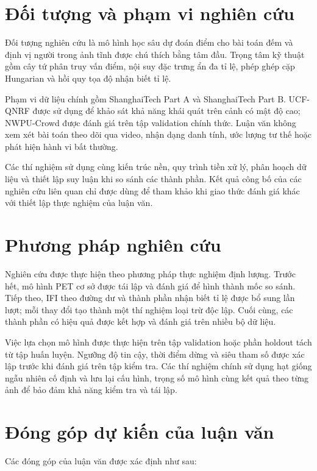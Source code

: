 \section{Đối tượng và phạm vi nghiên cứu}

Đối tượng nghiên cứu là mô hình học sâu dự đoán điểm cho bài toán đếm và định vị người trong ảnh tĩnh được chú thích bằng tâm đầu. Trọng tâm kỹ thuật gồm cây tứ phân truy vấn điểm, nội suy đặc trưng ẩn đa tỉ lệ, phép ghép cặp Hungarian và hồi quy tọa độ nhận biết tỉ lệ.

Phạm vi dữ liệu chính gồm ShanghaiTech Part A và ShanghaiTech Part B. UCF-QNRF được sử dụng để khảo sát khả năng khái quát trên cảnh có mật độ cao; NWPU-Crowd được đánh giá trên tập validation chính thức. Luận văn không xem xét bài toán theo dõi qua video, nhận dạng danh tính, ước lượng tư thế hoặc phát hiện hành vi bất thường.

Các thí nghiệm sử dụng cùng kiến trúc nền, quy trình tiền xử lý, phân hoạch dữ liệu và thiết lập suy luận khi so sánh các thành phần. Kết quả công bố của các nghiên cứu liên quan chỉ được dùng để tham khảo khi giao thức đánh giá khác với thiết lập thực nghiệm của luận văn.

\section{Phương pháp nghiên cứu}

Nghiên cứu được thực hiện theo phương pháp thực nghiệm định lượng. Trước hết, mô hình PET cơ sở được tái lập và đánh giá để hình thành mốc so sánh. Tiếp theo, IFI theo đường dư và thành phần nhận biết tỉ lệ được bổ sung lần lượt; mỗi thay đổi tạo thành một thí nghiệm loại trừ độc lập. Cuối cùng, các thành phần có hiệu quả được kết hợp và đánh giá trên nhiều bộ dữ liệu.

Việc lựa chọn mô hình được thực hiện trên tập validation hoặc phần holdout tách từ tập huấn luyện. Ngưỡng độ tin cậy, thời điểm dừng và siêu tham số được xác lập trước khi đánh giá trên tập kiểm tra. Các thí nghiệm chính sử dụng hạt giống ngẫu nhiên cố định và lưu lại cấu hình, trọng số mô hình cùng kết quả theo từng ảnh để bảo đảm khả năng kiểm tra và tái lập.

\section{Đóng góp dự kiến của luận văn}

Các đóng góp của luận văn được xác định như sau:


